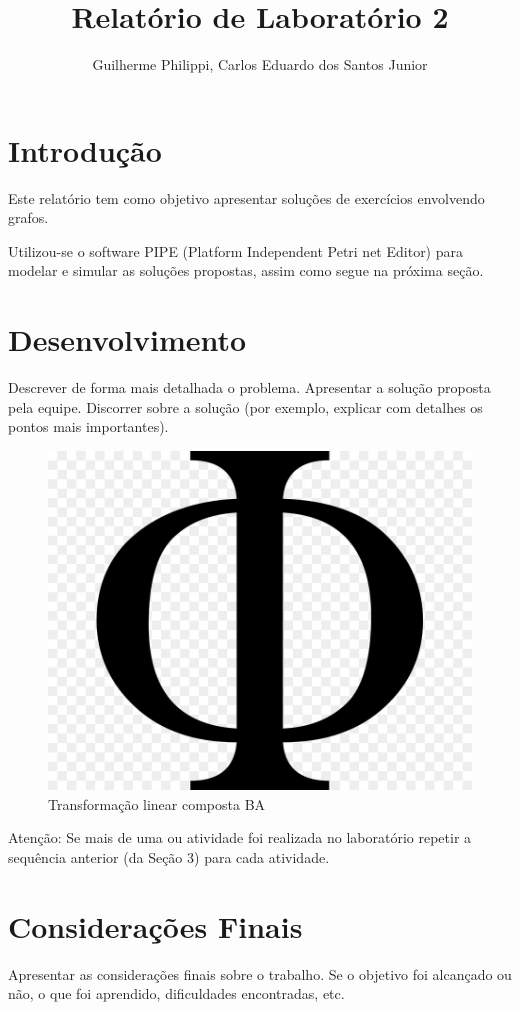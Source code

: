 \documentclass[a4paper,12pt]{article}
\title{Relatório de Laboratório 2}
\author{Guilherme Philippi, Carlos Eduardo dos Santos Junior}
\begin{document}
\maketitle
\tableofcontents

\section{Introdução}

Este relatório tem como objetivo apresentar soluções de exercícios envolvendo grafos.

Utilizou-se o software PIPE (Platform Independent Petri net Editor) \cite{dias2007ferramentas} para modelar e simular as soluções propostas, assim como segue na próxima seção.

\section{Desenvolvimento}
Descrever de forma mais detalhada o problema.
Apresentar a solução proposta pela equipe.
Discorrer sobre a solução (por exemplo, explicar com detalhes os pontos mais
importantes).

\begin{figure}[H]
	\begin{center}
		\includegraphics[width=0.4\linewidth]{img.png}
	\end{center}
	\caption{Transformação linear composta BA}
	\label{fig:compfunc}
\end{figure}

Atenção: Se mais de uma ou atividade foi realizada no laboratório repetir a sequência
anterior (da Seção 3) para cada atividade.

\section{Considerações Finais}
Apresentar as considerações finais sobre o trabalho. Se o objetivo foi alcançado ou não,
o que foi aprendido, dificuldades encontradas, etc.

\newpage
{}
{}



\end{document}
